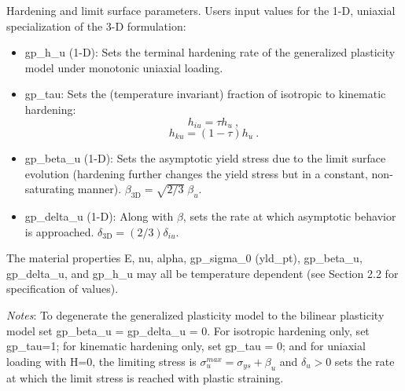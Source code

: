 \documentclass[11pt]{report}
\numberwithin{equation}{section}
\begin{document}
\noindent Hardening and limit surface parameters. Users input values for the 1-D, uniaxial 
specialization of the 3-D formulation:
\begin {itemize}
\item gp\_h\_u (1-D): Sets the terminal hardening rate of the generalized plasticity model under
monotonic uniaxial loading. 
\item gp\_tau: Sets the (temperature invariant) fraction of isotropic to kinematic hardening: 
\begin{equation}
h_{iu} = \tau h_u ~,
\end{equation}
\begin{equation}
h_{ku} = \left( 1-\tau \right) h_u ~.
\end{equation}
\item gp\_beta\_u (1-D): Sets the asymptotic yield stress due to the limit 
surface evolution (hardening further changes the yield stress 
but in a constant, non-saturating manner). $\beta_{\textrm{3D}} = \sqrt{2/3} 
\;\beta_u$.
\item gp\_delta\_u (1-D): Along with $\beta$, sets the rate at which 
asymptotic behavior is approached. $\delta_{\textrm{3D}} = (2/3) \delta_{iu}$.
\end{itemize}

The material properties E, nu, alpha, gp\_sigma\_0 (yld\_pt), gp\_beta\_u, gp\_delta\_u, and
 gp\_h\_u may all be temperature dependent (see Section 2.2 for specification of values).
 
\textit{Notes}: To degenerate the generalized 
plasticity model to the bilinear
plasticity model set gp\_beta\_u = gp\_delta\_u = 0. For 
isotropic hardening only,  set gp\_tau=1;
for kinematic hardening only, set gp\_tau = 0; and for uniaxial loading with 
H=0, the limiting stress is $\sigma_u^{max} = \sigma_{ys} + \beta_u$ 
and $\delta_u >0$ sets the rate at which
the limit stress is reached with plastic straining.
\end{document}
